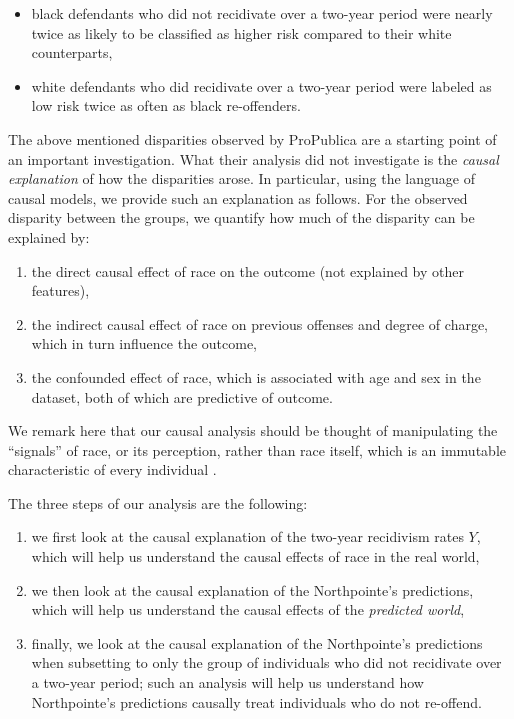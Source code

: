 \documentclass{article}
\providecommand{\tightlist}{%
  \setlength{\itemsep}{0pt}\setlength{\parskip}{0pt}}
\begin{document}
\begin{itemize}
\tightlist
\item
  black defendants who did not recidivate over a two-year period were
  nearly twice as likely to be classified as higher risk compared to
  their white counterparts,
\item
  white defendants who did recidivate over a two-year period were
  labeled as low risk twice as often as black re-offenders.
\end{itemize}

The above mentioned disparities observed by ProPublica are a starting
point of an important investigation. What their analysis did not
investigate is the \emph{causal explanation} of how the disparities
arose. In particular, using the language of causal models, we provide
such an explanation as follows. For the observed disparity between the
groups, we quantify how much of the disparity can be explained by:

\begin{enumerate}[label=(\roman*)]
  \item the direct causal effect of race on the outcome (not explained by other features),
  \item  the indirect causal effect of race on previous offenses and degree of charge, which in turn influence the outcome,
  \item the confounded effect of race, which is associated with age and sex in the dataset, both of which are predictive of outcome.
\end{enumerate}

We remark here that our causal analysis should be thought of
manipulating the ``signals'' of race, or its perception, rather than
race itself, which is an immutable characteristic of every individual
\cite{weinberger2022signal, greiner2011causal}.

The three steps of our analysis are the following:

\begin{enumerate}[label=(\Alph*)]
  \item we first look at the causal explanation of the two-year recidivism rates $Y$, which will help us understand the causal effects of race in the real world,
  \item  we then look at the causal explanation of the Northpointe's predictions, which will help us understand the causal effects of the \textit{predicted world},
  \item finally, we look at the causal explanation of the Northpointe's predictions when subsetting to only the group of individuals who did not recidivate over a two-year period; such an analysis will help us understand how Northpointe's predictions causally treat individuals who do not re-offend.
\end{enumerate}
\end{document}
